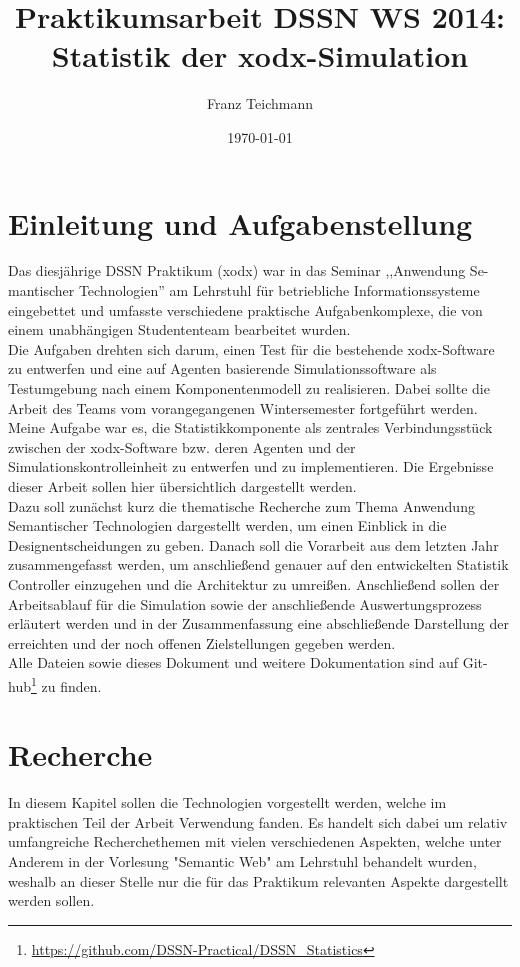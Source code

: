 \documentclass{article}
\title{Praktikumsarbeit DSSN WS 2014: \\ Statistik der xodx-Simulation}
\author{Franz Teichmann}
\date{\today}
\begin{document}
\maketitle

\tableofcontents
\newpage

\section{Einleitung und Aufgabenstellung}

Das diesjährige DSSN Praktikum (xodx) war in das Seminar ,,Anwendung Se-mantischer Technologien'' am Lehrstuhl für betriebliche Informationssysteme eingebettet und umfasste verschiedene praktische Aufgabenkomplexe, die von einem unabhängigen Studententeam bearbeitet wurden.\\
Die Aufgaben drehten sich darum, einen Test für die bestehende xodx-Software zu entwerfen und eine auf Agenten basierende Simulationssoftware als Testumgebung nach einem Komponentenmodell zu realisieren. Dabei sollte die Arbeit des Teams vom vorangegangenen Wintersemester fortgeführt werden.\\
Meine Aufgabe war es, die Statistikkomponente als zentrales Verbindungsstück zwischen der xodx-Software bzw. deren Agenten und der Simulationskontrolleinheit zu entwerfen und zu implementieren. Die Ergebnisse dieser Arbeit sollen hier übersichtlich dargestellt werden.\\
Dazu soll zunächst kurz die thematische Recherche zum Thema Anwendung Semantischer Technologien dargestellt werden, um einen Einblick in die Designentscheidungen zu geben. Danach soll die Vorarbeit aus dem letzten Jahr zusammengefasst werden, um anschließend genauer auf den entwickelten Statistik Controller einzugehen und die Architektur zu umreißen. Anschließend sollen der Arbeitsablauf für die Simulation sowie der anschließende Auswertungsprozess erläutert werden und in der Zusammenfassung eine abschließende Darstellung der erreichten und der noch offenen Zielstellungen gegeben werden.\\
Alle Dateien sowie dieses Dokument und weitere Dokumentation sind auf Git-hub\footnote{\url{https://github.com/DSSN-Practical/DSSN_Statistics}} zu finden.

\section{Recherche}

In diesem Kapitel sollen die Technologien vorgestellt werden, welche im praktischen Teil der Arbeit Verwendung fanden. Es handelt sich dabei um relativ umfangreiche Recherchethemen mit vielen verschiedenen Aspekten, welche unter Anderem in der Vorlesung "Semantic Web" am Lehrstuhl behandelt wurden, weshalb an dieser Stelle nur die für das Praktikum relevanten Aspekte dargestellt werden sollen.
\end{document}
